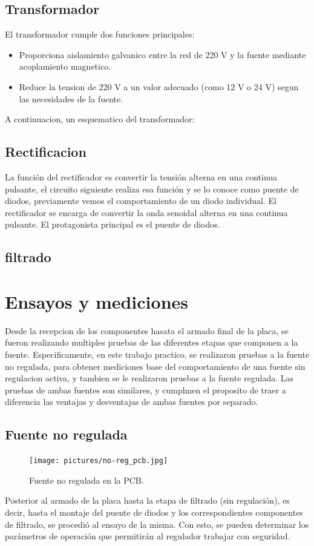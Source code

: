 \documentclass[chaptersright]{informeutn}
\begin{document}
      \section{Transformador}
        El transformador cumple dos funciones principales:
        \begin{itemize}
          \item Proporciona aislamiento galvanico entre la red de 220 V y la fuente mediante acoplamiento magnetico.
          \item Reduce la tension de 220 V a un valor adecuado (como 12 V o 24 V) segun las necesidades de la fuente.
        \end{itemize}
        A continuacion, un esquematico del transformador:
        


      \section{Rectificacion}
        La función del rectificador es convertir la tensión alterna en una continua pulsante, el circuito siguiente 
        realiza esa función y se lo conoce como puente de diodos, previamente vemos el comportamiento de un diodo 
        individual.
        El rectificador se encarga de convertir la onda senoidal alterna en una continua pulsante. El protagonista
        principal es el puente de diodos.

              \section{filtrado}

  \chapter{Ensayos y mediciones}
    Desde la recepcion de los componentes hasata el armado final de la placa, se fueron realizando multiples pruebas
    de las diferentes etapas que componen a la fuente. Especificamente, en este trabajo practico, se realizaron pruebas
    a la fuente no regulada, para obtener mediciones base del comportamiento de una fuente sin regulacion activa, y
    tambien se le realizaron pruebas a la fuente regulada. Las pruebas de ambas fuentes son similares, y cumplmen el
    proposito de traer a diferencia las ventajas y desventajas de ambas fuentes por separado.

    \section{Fuente no regulada}
      \begin{figure}
        \centering
        \texttt{[image: pictures/no-reg\_pcb.jpg]}
        \caption{Fuente no regulada en la PCB.}
      \end{figure}
      Posterior al armado de la placa hasta la etapa de filtrado (sin regulación), es decir, hasta el montaje del
      puente de diodos y los correspondientes componentes de filtrado, se procedió al ensayo de la misma. Con esto,
      se pueden determinar los parámetros de operación que permitirán al regulador trabajar con seguridad.
\end{document}
